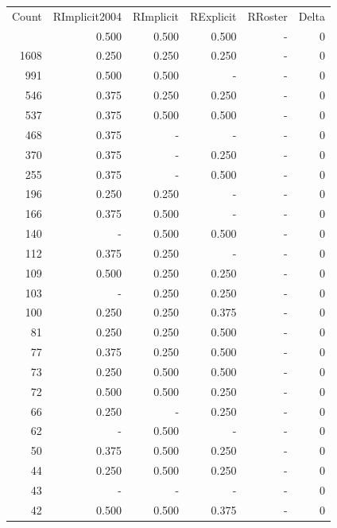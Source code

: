 \documentclass[a4paper]{article}\usepackage[]{graphicx}\usepackage[]{color}
\begin{document}
\begin{table}[ht]
\centering
\begin{tabular}{rrrrrr}
  \hline
Count & RImplicit2004 & RImplicit & RExplicit & RRoster & Delta \\ 
  \rowcolor{goodColor}  \hline
4513 & 0.500 & 0.500 & 0.500 & - & 0 \\ 
   \rowcolor{goodColor} 1608 & 0.250 & 0.250 & 0.250 & - & 0 \\ 
  991 & 0.500 & 0.500 & - & - & 0 \\ 
   \rowcolor{goodColor} 546 & 0.375 & 0.250 & 0.250 & - & 0 \\ 
   \rowcolor{goodColor} 537 & 0.375 & 0.500 & 0.500 & - & 0 \\ 
   \rowcolor{nullColor} 468 & 0.375 & - & - & - & 0 \\ 
   \rowcolor{sosoColor} 370 & 0.375 & - & 0.250 & - & 0 \\ 
   \rowcolor{sosoColor} 255 & 0.375 & - & 0.500 & - & 0 \\ 
  196 & 0.250 & 0.250 & - & - & 0 \\ 
  166 & 0.375 & 0.500 & - & - & 0 \\ 
   \rowcolor{goodColor} 140 & - & 0.500 & 0.500 & - & 0 \\ 
  112 & 0.375 & 0.250 & - & - & 0 \\ 
   \rowcolor{goodColor} 109 & 0.500 & 0.250 & 0.250 & - & 0 \\ 
   \rowcolor{goodColor} 103 & - & 0.250 & 0.250 & - & 0 \\ 
  100 & 0.250 & 0.250 & 0.375 & - & 0 \\ 
   \rowcolor{badColor} 81 & 0.250 & 0.250 & 0.500 & - & 0 \\ 
   \rowcolor{badColor} 77 & 0.375 & 0.250 & 0.500 & - & 0 \\ 
   \rowcolor{goodColor} 73 & 0.250 & 0.500 & 0.500 & - & 0 \\ 
   \rowcolor{badColor} 72 & 0.500 & 0.500 & 0.250 & - & 0 \\ 
   \rowcolor{sosoColor} 66 & 0.250 & - & 0.250 & - & 0 \\ 
  62 & - & 0.500 & - & - & 0 \\ 
   \rowcolor{badColor} 50 & 0.375 & 0.500 & 0.250 & - & 0 \\ 
   \rowcolor{badColor} 44 & 0.250 & 0.500 & 0.250 & - & 0 \\ 
   \rowcolor{nullColor} 43 & - & - & - & - & 0 \\ 
  42 & 0.500 & 0.500 & 0.375 & - & 0 \\ 

\end{tabular}
\end{table}
\end{document}
